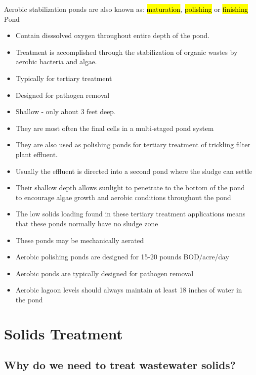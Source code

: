 Aerobic stabilization ponds are also known as: \hl{maturation}, \hl{polishing} or \hl{finishing} Pond
\begin{itemize}
\item Contain disssolved oxygen throughout entire depth of the pond.
\item Treatment is accomplished through the stabilization of organic wastes by aerobic bacteria and algae.
\item Typically for tertiary treatment
\item Designed for pathogen removal
\item Shallow - only about 3 feet deep. 
\item They are most often the final cells in a multi-staged pond system
\item They are also used as polishing ponds for tertiary treatment of trickling filter plant effluent.
\item Usually the effluent is directed into a second pond where the sludge can settle 
\item Their shallow depth allows sunlight to penetrate to the bottom of the pond to encourage algae growth and aerobic conditions throughout the pond 
\item The low solids loading found in these tertiary treatment applications means that these ponds normally have no sludge zone
\item These ponds may be mechanically aerated 
\item Aerobic polishing ponds are designed for 15-20 pounds BOD/acre/day
\item Aerobic ponds are typically designed for pathogen removal
\item Aerobic lagoon levels should always maintain at least 18 inches of water in the pond
\end{itemize}









\section{Solids Treatment}




\subsection{Why do we need to treat wastewater solids?}

